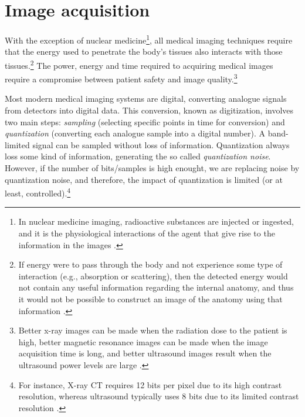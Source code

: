 \chapter{Image acquisition}

With the exception of nuclear medicine\footnote{In nuclear medicine
  imaging, radioactive substances are injected or ingested, and it is
  the physiological interactions of the agent that give rise to the
  information in the images \cite{bushberg2011essential}.}, all
medical imaging techniques require that the energy used to penetrate
the body’s tissues also interacts with those tissues.\footnote{If
  energy were to pass through the body and not experience some type of
  interaction (e.g., absorption or scattering), then the detected
  energy would not contain any useful information regarding the
  internal anatomy, and thus it would not be possible to construct an
  image of the anatomy using that information
  \cite{bushberg2011essential}.} The power, energy and time required
to acquiring medical images require a compromise between patient
safety and image quality.\footnote{Better x-ray images can be made
  when the radiation dose to the patient is high, better magnetic
  resonance images can be made when the image acquisition time is
  long, and better ultrasound images result when the ultrasound power
  levels are large \cite{bushberg2011essential}.}

Most modern medical imaging systems are digital, converting analogue
signals from detectors into digital data. This conversion, known as
digitization, involves two main steps: \emph{sampling} (selecting
specific points in time for conversion) and \emph{quantization}
(converting each analogue sample into a digital number). A
band-limited signal can be sampled without loss of
information. Quantization always loss some kind of information,
generating the so called \emph{quantization noise}. However, if the
number of bits/samples is high enought, we are replacing noise by
quantization noise, and therefore, the impact of quantization is
limited (or at least, controlled).\footnote{For instance, X-ray CT
  requires 12 bits per pixel due to its high contrast resolution,
  whereas ultrasound typically uses 8 bits due to its limited contrast
  resolution \cite{bushberg2011essential}.}
